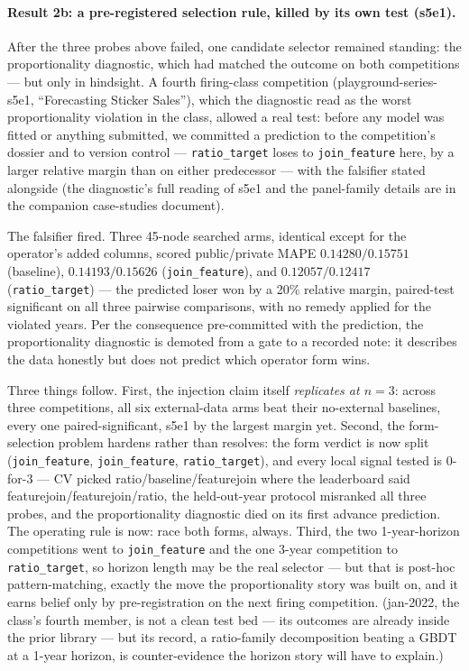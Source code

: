 \documentclass[11pt,a4paper]{article}
\begin{document}
\paragraph{Result 2b: a pre-registered selection rule, killed by its own test (s5e1).} After
the three probes above failed, one candidate selector remained standing: the proportionality
diagnostic, which had matched the outcome on both competitions --- but only in hindsight. A
fourth firing-class competition (playground-series-s5e1, ``Forecasting Sticker Sales''), which
the diagnostic read as the worst proportionality violation in the class, allowed a real test:
before any model was fitted or anything submitted, we committed a prediction to the
competition's dossier and to version control --- \texttt{ratio\_target} loses to
\texttt{join\_feature} here, by a larger relative margin than on either predecessor --- with
the falsifier stated alongside (the diagnostic's full reading of s5e1 and the panel-family
details are in the companion case-studies document).

The falsifier fired. Three 45-node searched arms, identical except for the operator's added
columns, scored public/private MAPE $0.14280/0.15751$ (baseline), $0.14193/0.15626$
(\texttt{join\_feature}), and $0.12057/\mathbf{0.12417}$ (\texttt{ratio\_target}) --- the predicted loser won by a 20\% relative
margin, paired-test significant on all three pairwise comparisons, with no remedy applied for
the violated years. Per the consequence pre-committed with the prediction, the proportionality
diagnostic is demoted from a gate to a recorded note: it describes the data honestly but does
not predict which operator form wins.

Three things follow. First, the injection claim itself \emph{replicates at $n{=}3$}: across
three competitions, all six external-data arms beat their no-external baselines, every one
paired-significant, s5e1 by the largest margin yet. Second, the form-selection problem hardens
rather than resolves: the form verdict is now split (\texttt{join\_feature},
\texttt{join\_feature}, \texttt{ratio\_target}), and every local signal tested is 0-for-3 ---
CV picked ratio/baseline/featurejoin where the leaderboard said featurejoin/featurejoin/ratio,
the held-out-year protocol misranked all three probes, and the proportionality diagnostic died on its first advance prediction. The operating rule is now: race both forms, always.
Third, the two 1-year-horizon competitions went to \texttt{join\_feature} and the one 3-year competition to \texttt{ratio\_target}, so horizon length may be the real selector --- but that is post-hoc pattern-matching, exactly the move the proportionality story was built on, and it earns belief only by pre-registration on the next firing competition. (jan-2022, the class's fourth member, is not a clean test bed --- its outcomes are already inside the prior library --- but its record, a ratio-family decomposition beating a GBDT at a 1-year horizon, is counter-evidence the horizon story will have to explain.)
\end{document}
